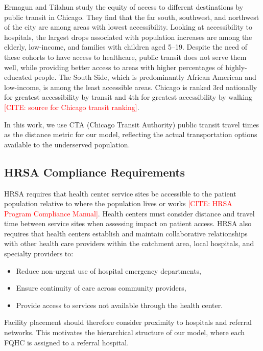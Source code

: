 \documentclass[11pt]{article}
\begin{document}
Ermagun and Tilahun \cite{ermagun2020equity} study the equity of access to different destinations by public transit 
in Chicago. They find that the far south, southwest, and northwest of the city are among areas with lowest accessibility. 
Looking at accessibility to hospitals, the largest drops associated with population increases are among the elderly, 
low-income, and families with children aged 5--19. Despite the need of these cohorts to have access to healthcare, 
public transit does not serve them well, while providing better access to areas with higher percentages of highly-educated 
people. The South Side, which is predominantly African American and low-income, is among the least accessible areas. 
Chicago is ranked 3rd nationally for greatest accessibility by transit and 4th for greatest accessibility by walking \textcolor{red}{[CITE: source for Chicago transit ranking]}.

In this work, we use CTA (Chicago Transit Authority) public transit travel times as the distance metric for our model, 
reflecting the actual transportation options available to the underserved population.


\subsection{HRSA Compliance Requirements}\label{sec:hrsa-compliance}

HRSA requires that health center service sites be accessible to the patient population relative to where the population 
lives or works \textcolor{red}{[CITE: HRSA Program Compliance Manual]}. Health centers must consider distance and travel 
time between service sites when assessing impact on patient access. HRSA also requires that health centers establish and 
maintain collaborative relationships with other health care providers within the catchment area, local hospitals, and 
specialty providers to:
\begin{itemize}
    \item Reduce non-urgent use of hospital emergency departments,
    \item Ensure continuity of care across community providers,
    \item Provide access to services not available through the health center.
\end{itemize}

Facility placement should therefore consider proximity to hospitals and referral networks. This motivates the hierarchical 
structure of our model, where each FQHC is assigned to a referral hospital.
\end{document}
